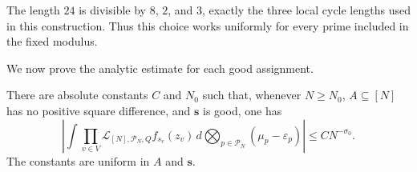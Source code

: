 The length $24$ is divisible by $8$, $2$, and $3$, exactly the three
local cycle lengths used in this construction. Thus this choice works
uniformly for every prime included in the fixed modulus.

We now prove the analytic estimate for each good assignment.

\begin{proposition}
\label{prop:nonexceptional-contraction}
There are absolute constants \(C\) and \(N_0\) such that, whenever
\(N\ge N_0\), \(A\subseteq[N]\) has no positive square difference, and
\(\boldsymbol s\) is good, one has
\begin{equation}
 \left|\int\prod_{v\in V}
  \mathcal L_{[N],\mathcal P_N,Q}f_{s_v}(z_v)
  \,d\bigotimes_{p\in\mathcal P_N}(\mu_p-\varepsilon_p)\right|
 \le C N^{-\sigma_0}.
 \label{eq:nonexceptional-contraction}
\end{equation}
The constants are uniform in \(A\) and \(\boldsymbol s\).
\end{proposition}

